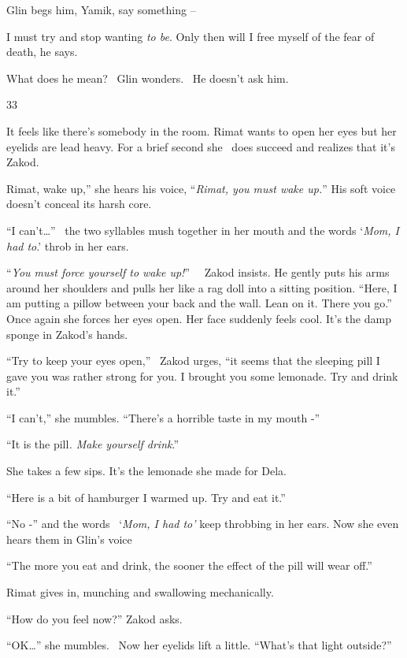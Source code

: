 \documentclass[12pt]{book}
\begin{document}
Glin begs him, {\textquotedbl}Yamik, say something --{\textquotedbl}

{\textquotedbl}I must try and stop wanting \textit{to be}. Only then will I free myself of the fear of
death,{\textquotedbl} he says.

What does he mean? \ Glin wonders. \ He doesn't ask him.


\bigskip

33

It feels like there's somebody in the room. Rimat wants to open her eyes but her eyelids are lead heavy. For a brief
second she \ does succeed and realizes that it's Zakod.

{\textquotedbl}Rimat, wake up,'' she hears his voice, ``\textit{Rimat, you must wake up.}{}''\textit{ }His soft voice
doesn't conceal its harsh core.

{}``I can't{\dots}'' \ the two syllables mush together in her mouth and the words `\textit{Mom, I had to}.' throb in her
ears.

{}``\textit{You must force yourself to wake up!}{}'' \textit{\ }\ Zakod insists. He gently puts his arms around her
shoulders and pulls her like a rag doll into a sitting position. ``Here, I am putting a pillow between your back and
the wall. Lean on it. There you go.'' Once again she forces her eyes open. Her face suddenly feels cool. It's the damp
sponge in Zakod's hands.

{}``Try to keep your eyes open,'' \ Zakod urges, ``it seems that the sleeping pill I gave you was rather strong for you.
I brought you some lemonade. Try and drink it.''

{}``I can't,'' she mumbles. ``There's a horrible taste in my mouth -''

{}``It is the pill\textit{. Make yourself drink}.''

She takes a few sips. It's the lemonade she made for Dela.

{}``Here is a bit of hamburger I warmed up. Try and eat it.''

{}``No -'' and the words \ {}`\textit{Mom, I had to'} keep throbbing in her ears. Now she even hears them in Glin's
voice

{}``The more you eat and drink, the sooner the effect of the pill will wear off.''

Rimat gives in, munching and swallowing mechanically.

{}``How do you feel now?'' Zakod asks.

{}``OK{\dots}'' she mumbles.~ Now her eyelids lift a little. ``What's that light outside?''
\end{document}
